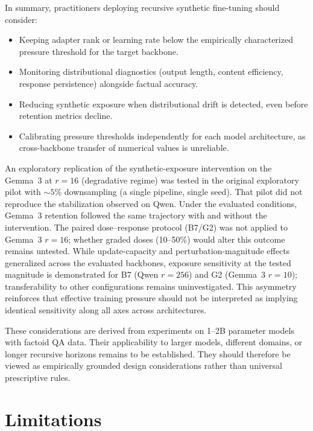 \documentclass[a4paper,fleqn]{cas-dc}
\newif\ifshowchanges
\newcommand{\rev}[1]{\ifshowchanges{\color{blue}#1}\else{#1}\fi}
\begin{document}
In summary, practitioners deploying recursive synthetic fine-tuning should
consider:
\begin{itemize}
    \item Keeping adapter rank or learning rate below the empirically
    characterized pressure threshold for the target backbone.
    \item Monitoring distributional diagnostics (output length, content
    efficiency, response persistence) alongside factual accuracy.
    \item Reducing synthetic exposure when distributional drift is detected,
    even before retention metrics decline.
    \item Calibrating pressure thresholds independently for each model
    architecture, as cross-backbone transfer of numerical values is unreliable.
\end{itemize}

An exploratory replication of the synthetic-exposure intervention on the
\rev{Gemma~3 at $r=16$ (degradative regime) was tested in the original
exploratory pilot with ${\sim}5\%$ downsampling (a single pipeline, single seed).
That pilot did not reproduce the stabilization observed on Qwen.
Under the evaluated conditions, Gemma~3 retention followed the same
trajectory with and without the intervention. The paired dose--response
protocol (B7/G2) was not applied to Gemma~3 $r=16$; whether graded doses
(10--50\%) would alter this outcome remains untested.}
While update-capacity and
perturbation-magnitude effects generalized across the evaluated backbones,
exposure sensitivity at the tested magnitude is demonstrated for B7 (Qwen $r=256$) and G2 (Gemma~3 $r=10$); transferability to other configurations remains
uninvestigated. This asymmetry reinforces that effective
training pressure should not be interpreted as implying identical sensitivity
along all axes across architectures.

These considerations are derived from experiments on 1--2B parameter models with
factoid QA data. Their applicability to larger models, different domains, or
longer recursive horizons remains to be established. They should therefore be
viewed as empirically grounded design considerations rather than universal
prescriptive rules.

\section{Limitations}\label{sec:limitations}
\end{document}
